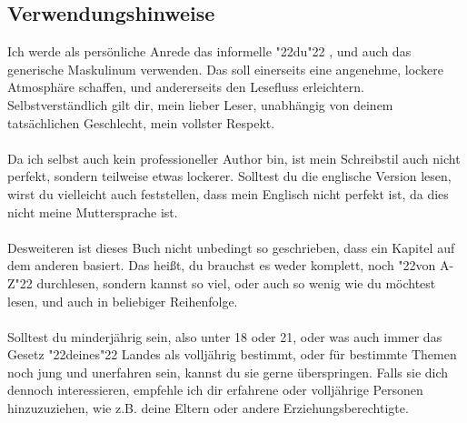 \documentclass[12pt,a5paper]{article}
\newcommand{\q}[1]{\char"22{#1}\char"22 }
\begin{document}
	\newpage
	\subsection{Verwendungshinweise}
		Ich werde als pers\"onliche Anrede das informelle \q{du},
		und auch das generische Maskulinum verwenden.
		Das soll einerseits eine angenehme,
		lockere Atmosph\"are schaffen,
		und andererseits den Lesefluss erleichtern.
		Selbstverst\"andlich gilt dir,
		mein lieber Leser,
		unabh\"angig von deinem tats\"achlichen Geschlecht,
		mein vollster Respekt.
		\\
		\\
		Da ich selbst auch kein professioneller Author bin,
		ist mein Schreibstil auch nicht perfekt,
		sondern teilweise etwas lockerer.
		Solltest du die englische Version lesen,
		wirst du vielleicht auch feststellen,
		dass mein Englisch nicht perfekt ist,
		da dies nicht meine Muttersprache ist.
		\\
		\\
		Desweiteren ist dieses Buch nicht unbedingt so geschrieben,
		dass ein Kapitel auf dem anderen basiert.
		Das hei{\ss}t,
		du brauchst es weder komplett,
		noch \q{von A-Z} durchlesen,
		sondern kannst so viel,
		oder auch so wenig wie du m\"ochtest lesen,
		und auch in beliebiger Reihenfolge.
		\\
		\\
		Solltest du minderj\"ahrig sein,
		also unter 18 oder 21,
		oder was auch immer das Gesetz \q{deines} Landes als vollj\"ahrig bestimmt,
		oder f\"ur bestimmte Themen noch jung und unerfahren sein,
		kannst du sie gerne \"uberspringen.
		Falls sie dich dennoch interessieren,
		empfehle ich dir erfahrene oder vollj\"ahrige Personen hinzuzuziehen,
		wie z.B. deine Eltern oder andere Erziehungsberechtigte.

	\newpage
\end{document}
